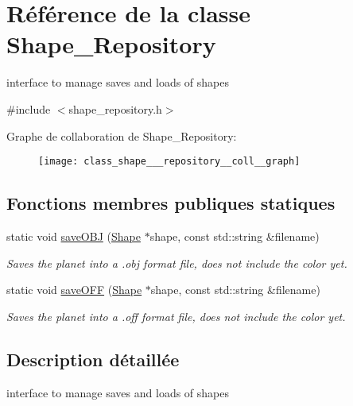 \hypertarget{class_shape___repository}{}\section{Référence de la classe Shape\+\_\+\+Repository}
\label{class_shape___repository}


interface to manage saves and loads of shapes  




{\ttfamily \#include $<$shape\+\_\+repository.\+h$>$}



Graphe de collaboration de Shape\+\_\+\+Repository\+:\nopagebreak
\begin{figure}[H]
\begin{center}
\leavevmode
\texttt{[image: class\_shape\_\_\_repository\_\_coll\_\_graph]}
\end{center}
\end{figure}
\subsection*{Fonctions membres publiques statiques}
\begin{DoxyCompactItemize}
\item 
static void \hyperlink{class_shape___repository_a0a0e36f8beab55be3c88e08c823819cd}{save\+O\+BJ} (\hyperlink{class_shape}{Shape} $\ast$shape, const std\+::string \&filename)
\begin{DoxyCompactList}\small\item\em Saves the planet into a .obj format file, does not include the color yet. \end{DoxyCompactList}\item 
static void \hyperlink{class_shape___repository_ad52141b6883d20084a0105355f2271b5}{save\+O\+FF} (\hyperlink{class_shape}{Shape} $\ast$shape, const std\+::string \&filename)
\begin{DoxyCompactList}\small\item\em Saves the planet into a .off format file, does not include the color yet. \end{DoxyCompactList}\end{DoxyCompactItemize}


\subsection{Description détaillée}
interface to manage saves and loads of shapes 

